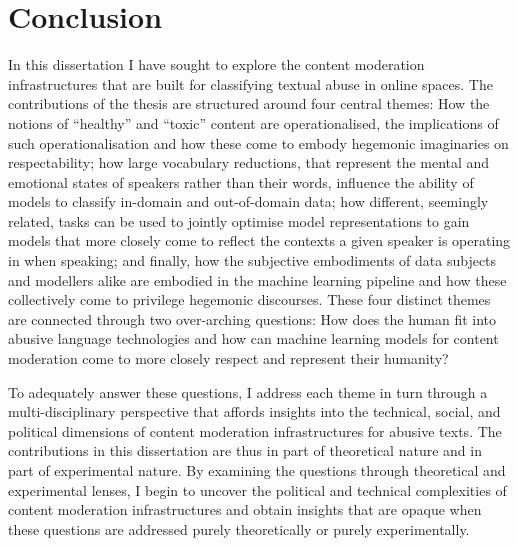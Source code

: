 \ifpdf
    \graphicspath{{Chapter8/Figs/Raster/}{Chapter8/Figs/PDF/}{Chapter8/Figs/}}
\else
    \graphicspath{{Chapter8/Figs/Vector/}{Chapter8/Figs/}}
\fi

\chapter{Conclusion}

In this dissertation I have sought to explore the content moderation infrastructures that are built for classifying textual abuse in online spaces.
The contributions of the thesis are structured around four central themes:
How the notions of ``healthy'' and ``toxic'' content are operationalised, the implications of such operationalisation and how these come to embody hegemonic imaginaries on respectability;
how large vocabulary reductions, that represent the mental and emotional states of speakers rather than their words, influence the ability of models to classify in-domain and out-of-domain data;
how different, seemingly related, tasks can be used to jointly optimise model representations to gain models that more closely come to reflect the contexts a given speaker is operating in when speaking;
and finally, how the subjective embodiments of data subjects and modellers alike are embodied in the machine learning pipeline and how these collectively come to privilege hegemonic discourses.
These four distinct themes are connected through two over-arching questions: How does the human fit into abusive language technologies and how can machine learning models for content moderation come to more closely respect and represent their humanity?

To adequately answer these questions, I address each theme in turn through a multi-disciplinary perspective that affords insights into the technical, social, and political dimensions of content moderation infrastructures for abusive texts.
The contributions in this dissertation are thus in part of theoretical nature and in part of experimental nature.
By examining the questions through theoretical and experimental lenses, I begin to uncover the political and technical complexities of content moderation infrastructures and obtain insights that are opaque when these questions are addressed purely theoretically or purely experimentally.
